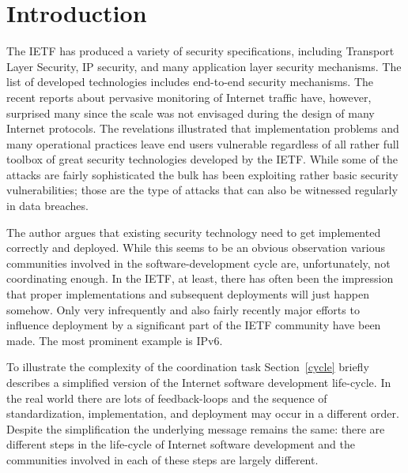 \documentclass[peerreview, a4paper, 7pt]{IEEEtran}
\begin{document}
\section{Introduction}

The IETF has produced a variety of security specifications, including Transport Layer Security, IP security, and many application layer security mechanisms. The list of developed technologies includes end-to-end security mechanisms. The recent reports about pervasive monitoring of Internet traffic have, however, surprised many since the scale was not envisaged during the design of many Internet protocols. The revelations illustrated that implementation problems and many operational practices leave end users vulnerable regardless of all rather full toolbox of great security technologies developed by the IETF. While some of the attacks are fairly sophisticated the bulk has been exploiting rather basic security vulnerabilities; those are the type of attacks that can also be witnessed regularly in data breaches.

The author argues that existing security technology need to get implemented correctly and deployed. While this seems to be an obvious observation various communities involved in the software-development cycle are, unfortunately, not coordinating enough. In the IETF, at least, there has often been the impression that proper implementations and subsequent deployments will just happen somehow. Only very infrequently and also fairly recently major efforts to influence deployment by a significant part of the IETF community have been made. The most prominent example is IPv6. 

To illustrate the complexity of the coordination task Section~\ref{cycle} briefly describes a simplified version of the Internet software development life-cycle. In the real world there are lots of feedback-loops and the sequence of standardization, implementation, and deployment may occur in a different order. Despite the simplification the underlying message remains the same: there are different steps in the life-cycle of Internet software development and the communities involved in each of these steps are largely different.


\end{document}
